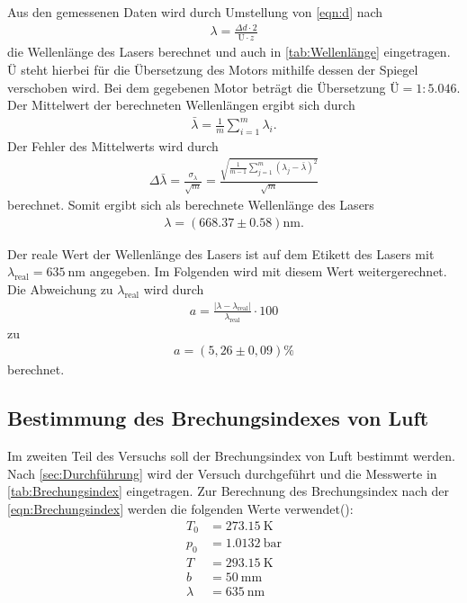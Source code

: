 Aus den gemessenen Daten wird durch Umstellung von \autoref{eqn:d} nach
\begin{align*}
  \lambda = \frac{\Delta d \cdot 2}{ Ü \cdot z}
\end{align*}
die Wellenlänge des Lasers berechnet und auch in \autoref{tab:Wellenlänge} eingetragen.
$Ü$ steht hierbei für die Übersetzung des Motors mithilfe dessen der Spiegel verschoben wird.
Bei dem gegebenen Motor beträgt die Übersetzung $Ü= 1:5.046$. 
Der Mittelwert der berechneten Wellenlängen ergibt sich durch
\begin{align}
  \bar{\lambda}=\frac{1}{m} \sum_{i=1}^m \lambda_i.
  \label{eqn:Mittelwert}
\end{align}
Der Fehler des Mittelwerts wird durch 
\begin{align}
  \Delta \bar{\lambda}= \frac{\sigma_\lambda}{\sqrt{m}} = \frac{\sqrt{\frac{1}{m-1}\sum_{j=1}^m (\lambda_j-\bar{\lambda})^2}}{\sqrt{m}}
  \label{eqn:Fehler}
\end{align}
berechnet.
Somit ergibt sich als berechnete Wellenlänge des Lasers
\begin{align*}
  \lambda= (668.37 \pm 0.58 )\si{\nano\meter}.
\end{align*}

Der reale Wert der Wellenlänge des Lasers ist auf dem Etikett des Lasers mit $\lambda_{\text{real}}=\qty{635}{\nano\meter}$ angegeben.
Im Folgenden wird mit diesem Wert weitergerechnet.
Die Abweichung zu $\lambda_{\text{real}}$ wird durch
\begin{align}
  a=\frac{|\lambda-\lambda_{\text{real}}|}{\lambda_{\text{real}}}\cdot 100 \label{eqn:abweich}
\end{align}
zu
\begin{align*}
  a=(5,26 \pm 0,09) \si{\percent}
\end{align*}
berechnet.

\subsection{Bestimmung des Brechungsindexes von Luft}
\label{sub:Brechungsindex}

Im zweiten Teil des Versuchs soll der Brechungsindex von Luft bestimmt werden.
Nach \autoref{sec:Durchführung} wird der Versuch durchgeführt und die Messwerte in \autoref{tab:Brechungsindex} eingetragen.
Zur Berechnung des Brechungsindex nach der \autoref{eqn:Brechungsindex}
werden die folgenden Werte verwendet(\cite{V401}):
\begin{align*}
  T_0 &= \qty{273.15}{\kelvin}\\
  p_0 &= \qty{1.0132}{\bar}\\
  T &= \qty{293.15}{\kelvin}\\
  b &=\qty{50}{\milli\meter}\\
  \lambda &=\qty{635}{\nano\meter}
\end{align*}

